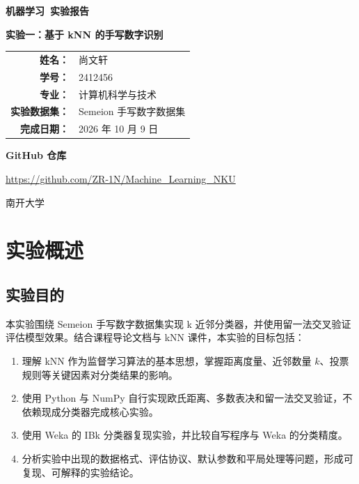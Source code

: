 \documentclass[UTF8,zihao=-4]{ctexart}
\newcommand{\course}{机器学习}
\newcommand{\reporttitle}{实验一：基于 kNN 的手写数字识别}
\newcommand{\studentname}{尚文轩}
\newcommand{\studentid}{2412456}
\newcommand{\major}{计算机科学与技术}
\begin{document}
\begin{titlepage}
  \centering
  \vspace*{2.8cm}
  {\fontsize{30}{40}\selectfont\bfseries \course\ 实验报告\par}
  \vspace{1.2cm}
  {\fontsize{24}{34}\selectfont\bfseries \reporttitle\par}
  \vspace{2.8cm}
  {\fontsize{16}{24}\selectfont
  \renewcommand{\arraystretch}{1.6}
  \begin{tabular}{>{\bfseries}r l}
    姓名： & \studentname \\
    学号： & \studentid \\
    专业： & \major \\
    实验数据集： & Semeion 手写数字数据集 \\
    完成日期： & 2026 年 10 月 9 日
  \end{tabular}\par}
  \vspace{1.2cm}
  {\fontsize{13}{20}\selectfont\bfseries GitHub 仓库\par}
  \vspace{0.3cm}
  {\fontsize{12}{18}\selectfont
  \url{https://github.com/ZR-1N/Machine_Learning_NKU}\par}
  \vfill
  {\large 南开大学\par}
\end{titlepage}

\clearpage
{}
\tableofcontents
\clearpage
{}

\section{实验概述}

\subsection{实验目的}

本实验围绕 Semeion 手写数字数据集实现 k 近邻分类器，并使用留一法交叉验证评估模型效果。结合课程导论文档与 kNN 课件，本实验的目标包括：

\begin{enumerate}[label=\arabic*.]
  \item 理解 kNN 作为监督学习算法的基本思想，掌握距离度量、近邻数量 $k$、投票规则等关键因素对分类结果的影响。
  \item 使用 Python 与 NumPy 自行实现欧氏距离、多数表决和留一法交叉验证，不依赖现成分类器完成核心实验。
  \item 使用 Weka 的 IBk 分类器复现实验，并比较自写程序与 Weka 的分类精度。
  \item 分析实验中出现的数据格式、评估协议、默认参数和平局处理等问题，形成可复现、可解释的实验结论。
\end{enumerate}
\end{document}
